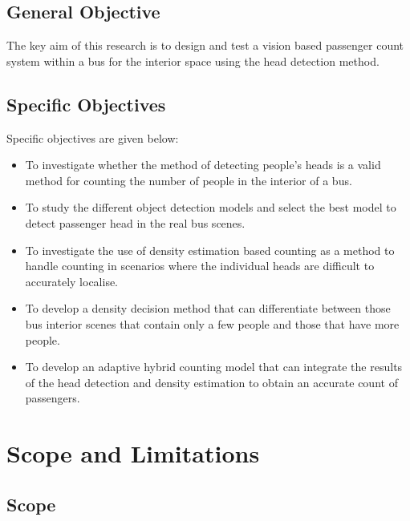 \subsection{General Objective}

The key aim of this research is to design and test a vision based passenger count system within a bus for the interior space using the head detection method.

\subsection{Specific Objectives}

Specific objectives are given below:

\begin{itemize}

    \item To investigate whether the method of detecting people's heads is a valid method for counting the number of people in the interior of a bus.
    
    \item To study the different object detection models and select the best model to detect passenger head in the real bus scenes.
    
    \item To investigate the use of density estimation based counting as a method to handle counting in scenarios where the individual heads are difficult to accurately localise.
    
    \item To develop a density decision method that can differentiate between those bus interior scenes that contain only a few people and those that have more people.
    
    \item To develop an adaptive hybrid counting model that can integrate the results of the head detection and density estimation to obtain an accurate count of passengers.
    
\end{itemize}


\section{Scope and Limitations}

\subsection{Scope}

